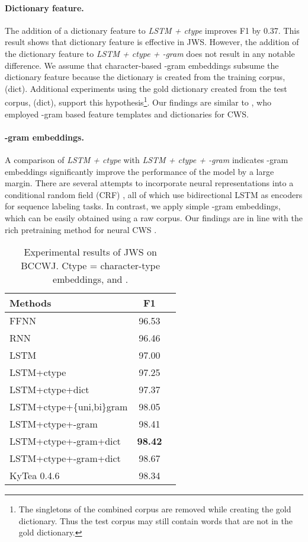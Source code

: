 \documentclass[11pt]{article}
\begin{document}
\paragraph{Dictionary feature.} The addition of a dictionary feature to {\it
LSTM + ctype} improves F1 by 0.37. This result shows that dictionary feature
is effective in JWS. However, the addition of the dictionary feature to {\it
LSTM + ctype + -gram} does not result in any notable difference. We
assume that character-based -gram embeddings subsume the dictionary
feature because the dictionary is created from the training corpus,
(dict). 
Additional experiments using the gold dictionary created from the test corpus,
(dict), support this hypothesis\footnote{The singletons of
the combined corpus are removed while creating the gold dictionary. Thus the
test corpus may still contain words that are not in the gold dictionary.}.
Our findings are similar to , who
employed -gram based feature templates and dictionaries for CWS.

\paragraph{-gram embeddings.} A comparison of {\it LSTM + ctype} with {\it
LSTM + ctype + -gram} indicates -gram embeddings significantly improve
the performance of the model by a large margin. 
There are several attempts to incorporate neural representations into
a conditional random field (CRF) \cite{ma-hovy:2016:ACL2016,lemple-EtAl:2016:NAACL2016,peters-EtAl:2017:ACL2017},
all of which use bidirectional LSTM as encoders for sequence labeling tasks.
In contrast, we apply simple -gram embeddings, which can be
easily obtained using a raw corpus. Our findings are in line with the rich
pretraining method for neural CWS \cite{yang-EtAl:2017:ACL2017}.

\begin{table}[t]
\caption{Experimental results of JWS on BCCWJ.
Ctype = character-type embeddings, and .}
\label{state_result}
\centering
\begin{tabular}{lcc}
\toprule
    Methods & F1 \\
  \midrule                  
      FFNN                              & 96.53 \\
      RNN                               & 96.46 \\
      LSTM                              & 97.00 \\
      LSTM+ctype                        & 97.25 \\    
      LSTM+ctype+dict  & 97.37 \\
      LSTM+ctype+\{uni,bi\}gram         & 98.05 \\
      LSTM+ctype+-gram               & 98.41 \\ 
      LSTM+ctype+-gram+dict  &{\bf 98.42} \\ 
      LSTM+ctype+-gram+dict & 98.67 \\
  \midrule
      KyTea 0.4.6                       & 98.34 \\
  \bottomrule
\end{tabular}
\end{table} 
\end{document}
